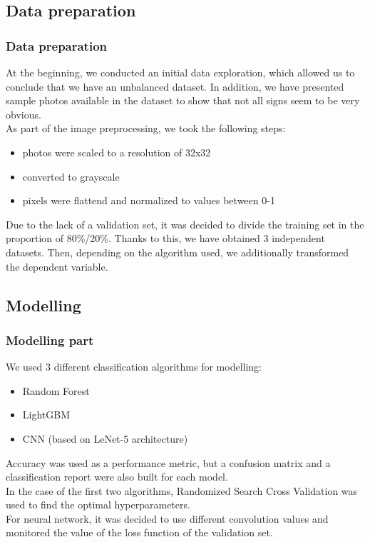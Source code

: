 \documentclass[8pt]{beamer}
\begin{document}
\subsection{Data preparation}
\begin{frame}
\frametitle{Data preparation}
At the beginning, we conducted an initial data exploration, which allowed us to conclude that we have an unbalanced dataset. In addition, we have presented sample photos available in the dataset to show that not all signs seem to be very obvious.\\
\vspace{2mm}
As part of the image preprocessing, we took the following steps:
\begin{itemize}
    \item<1-> photos were scaled to a resolution of 32x32
    \item<1-> converted to grayscale
    \item<1-> pixels were flattend and normalized to values between 0-1 
\end{itemize}
\vspace{2mm}
Due to the lack of a validation set, it was decided to divide the training set in the proportion of 80\%/20\%. Thanks to this, we have obtained 3 independent datasets.
Then, depending on the algorithm used, we additionally transformed the dependent variable.
\end{frame}

\subsection{Modelling}
\begin{frame}
\frametitle{Modelling part}
We used 3 different classification algorithms for modelling:
\begin{itemize}
    \item<1-> Random Forest
    \item<1-> LightGBM
    \item<1-> CNN (based on LeNet-5 architecture)
\end{itemize}

Accuracy was used as a performance metric, but a confusion matrix and a classification report were also built for each model.\\
\vspace{2mm}
In the case of the first two algorithms, Randomized Search Cross Validation was used to find the optimal hyperparameters.\\
\vspace{2mm}
For neural network, it was decided to use different convolution values and monitored the value of the loss function of the validation set.
\end{frame}
\end{document}
